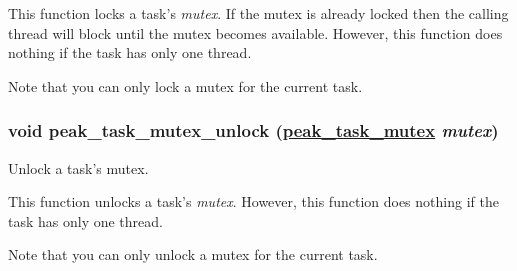 This function locks a task's {\em mutex\/}. If the mutex is already locked then the calling thread will block until the mutex becomes available. However, this function does nothing if the task has only one thread.\par
 Note that you can only lock a mutex for the current task. \hypertarget{group__task__sync_ga11}{
\subsubsection[peak\_\-task\_\-mutex\_\-unlock]{\setlength{\rightskip}{0pt plus 5cm}void peak\_\-task\_\-mutex\_\-unlock (\hyperlink{group__task__sync_ga1}{peak\_\-task\_\-mutex} {\em mutex})}}
\label{group__task__sync_ga11}


Unlock a task's mutex. 

This function unlocks a task's {\em mutex\/}. However, this function does nothing if the task has only one thread.\par
 Note that you can only unlock a mutex for the current task. 